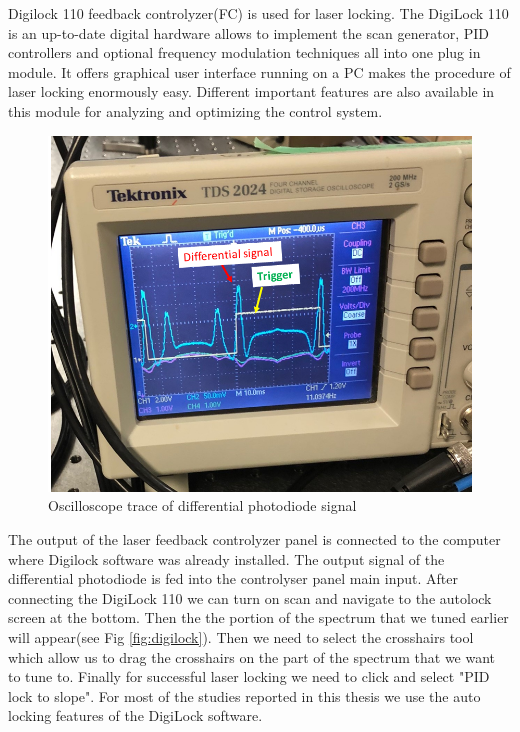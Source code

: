 Digilock 110 feedback controlyzer(FC) is used for laser locking. The DigiLock 110 is an up-to-date digital hardware allows to implement the scan generator, PID controllers and optional frequency modulation techniques all into one plug in module. It offers graphical user interface running on a PC makes the procedure of laser locking enormously easy. Different important features are also available in this module for analyzing and optimizing the control system.
 \begin{figure}[h]
\centering
\includegraphics[width=0.7\linewidth]{figures/laser tune.png}
\caption{Oscilloscope trace of differential photodiode signal \label{fig:laser tune}}
\end{figure}
The output of the laser feedback controlyzer panel is connected to the computer where Digilock software was already installed. The output signal of the differential photodiode is fed into the controlyser panel main input. After connecting the DigiLock 110 we can turn on scan and navigate to the autolock screen at the bottom. Then the the portion of the spectrum that we tuned earlier will appear(see Fig \ref{fig:digilock}). Then we need to select the crosshairs tool which allow us to drag the crosshairs on the part of the spectrum that we want to tune to. Finally for successful laser locking we need to click and select "PID lock to slope". For most of the studies reported in this thesis we use the auto locking features of the DigiLock software.

